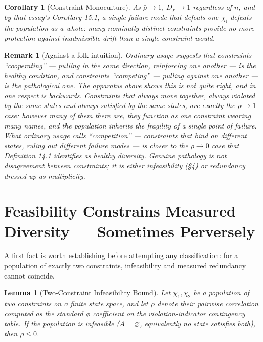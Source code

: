 \documentclass[11pt]{article}
\newtheorem{corollary}[definition]{Corollary}
\newtheorem{lemma}[definition]{Lemma}
\newtheorem*{remark}{Remark}
\begin{document}
\begin{corollary}[Constraint Monoculture]
As $\bar\rho\to1$, $D_\chi\to1$ regardless of $n$, and by that essay's Corollary 15.1, a single failure mode that defeats one $\chi_i$ defeats the population as a whole: many nominally distinct constraints provide no more protection against inadmissible drift than a single constraint would.
\end{corollary}

\begin{remark}[Against a folk intuition]
Ordinary usage suggests that constraints ``cooperating'' — pulling in the same direction, reinforcing one another — is the healthy condition, and constraints ``competing'' — pulling against one another — is the pathological one. The apparatus above shows this is not quite right, and in one respect is backwards. Constraints that always move together, always violated by the same states and always satisfied by the same states, are exactly the $\bar\rho\to1$ case: however many of them there are, they function as one constraint wearing many names, and the population inherits the fragility of a single point of failure. What ordinary usage calls ``competition'' — constraints that bind on different states, ruling out different failure modes — is closer to the $\bar\rho\to0$ case that Definition 14.1 identifies as healthy diversity. Genuine pathology is not disagreement between constraints; it is either infeasibility (§4) or redundancy dressed up as multiplicity.
\end{remark}

\section{Feasibility Constrains Measured Diversity — Sometimes Perversely}

A first fact is worth establishing before attempting any classification: for a population of exactly two constraints, infeasibility and measured redundancy cannot coincide.

\begin{lemma}[Two-Constraint Infeasibility Bound]
\label{lem:twoconstraint}
Let $\chi_1,\chi_2$ be a population of two constraints on a finite state space, and let $\bar\rho$ denote their pairwise correlation computed as the standard $\phi$ coefficient on the violation-indicator contingency table. If the population is infeasible ($A=\varnothing$, equivalently no state satisfies both), then $\bar\rho\leq0$.
\end{lemma}
\end{document}
